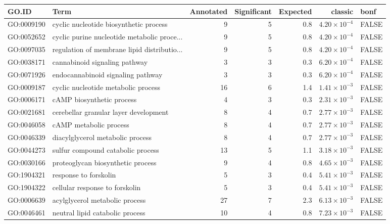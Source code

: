 \begin{table}[ht]
\centering
\begin{adjustbox}{width=\textwidth}
\begin{tabular}{llrrrrl}
  \hline
GO.ID & Term & Annotated & Significant & Expected & classic & bonf \\ 
  \hline
GO:0009190 & cyclic nucleotide biosynthetic process & 9 & 5 & 0.8 & $4.20 \times 10^{-4}$ & FALSE \\ 
  GO:0052652 & cyclic purine nucleotide metabolic proce... & 9 & 5 & 0.8 & $4.20 \times 10^{-4}$ & FALSE \\ 
  GO:0097035 & regulation of membrane lipid distributio... & 9 & 5 & 0.8 & $4.20 \times 10^{-4}$ & FALSE \\ 
  GO:0038171 & cannabinoid signaling pathway & 3 & 3 & 0.3 & $6.20 \times 10^{-4}$ & FALSE \\ 
  GO:0071926 & endocannabinoid signaling pathway & 3 & 3 & 0.3 & $6.20 \times 10^{-4}$ & FALSE \\ 
  GO:0009187 & cyclic nucleotide metabolic process & 16 & 6 & 1.4 & $1.41 \times 10^{-3}$ & FALSE \\ 
  GO:0006171 & cAMP biosynthetic process & 4 & 3 & 0.3 & $2.31 \times 10^{-3}$ & FALSE \\ 
  GO:0021681 & cerebellar granular layer development & 8 & 4 & 0.7 & $2.77 \times 10^{-3}$ & FALSE \\ 
  GO:0046058 & cAMP metabolic process & 8 & 4 & 0.7 & $2.77 \times 10^{-3}$ & FALSE \\ 
  GO:0046339 & diacylglycerol metabolic process & 8 & 4 & 0.7 & $2.77 \times 10^{-3}$ & FALSE \\ 
  GO:0044273 & sulfur compound catabolic process & 13 & 5 & 1.1 & $3.18 \times 10^{-3}$ & FALSE \\ 
  GO:0030166 & proteoglycan biosynthetic process & 9 & 4 & 0.8 & $4.65 \times 10^{-3}$ & FALSE \\ 
  GO:1904321 & response to forskolin & 5 & 3 & 0.4 & $5.41 \times 10^{-3}$ & FALSE \\ 
  GO:1904322 & cellular response to forskolin & 5 & 3 & 0.4 & $5.41 \times 10^{-3}$ & FALSE \\ 
  GO:0006639 & acylglycerol metabolic process & 27 & 7 & 2.3 & $6.13 \times 10^{-3}$ & FALSE \\ 
  GO:0046461 & neutral lipid catabolic process & 10 & 4 & 0.8 & $7.23 \times 10^{-3}$ & FALSE \\ 

\end{tabular}
\end{adjustbox}
\end{table}
